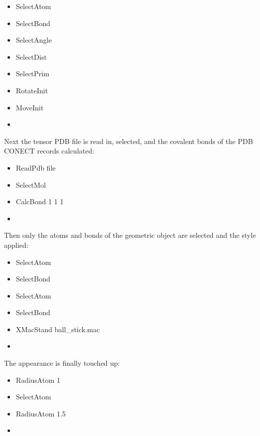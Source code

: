  \begin{itemize} 
 \item[] SelectAtom \quotecmd{}  
 \item[] SelectBond \quotecmd{}  
 \item[] SelectAngle \quotecmd{}  
 \item[] SelectDist \quotecmd{}  
 \item[] SelectPrim \quotecmd{}  
 \item[] RotateInit  
 \item[] MoveInit  
 \item[]  
 \end{itemize} 
  

 Next the tensor PDB file is read in, selected, and the covalent bonds of the PDB CONECT records calculated: 
  

 \begin{itemize} 
 \item[] ReadPdb file  
 \item[] SelectMol   
 \item[] CalcBond 1 1 1  
 \item[]  
 \end{itemize} 
  

 Then only the atoms and bonds of the geometric object are selected and the  style applied: 
  

 \begin{itemize} 
 \item[] SelectAtom   
 \item[] SelectBond   
 \item[] SelectAtom   
 \item[] SelectBond   
 \item[] XMacStand ball\_stick.mac  
 \item[]  
 \end{itemize} 
  

 The appearance is finally touched up: 
  

 \begin{itemize} 
 \item[] RadiusAtom 1  
 \item[] SelectAtom   
 \item[] RadiusAtom 1.5  
 \item[]  
 \end{itemize} 
  

